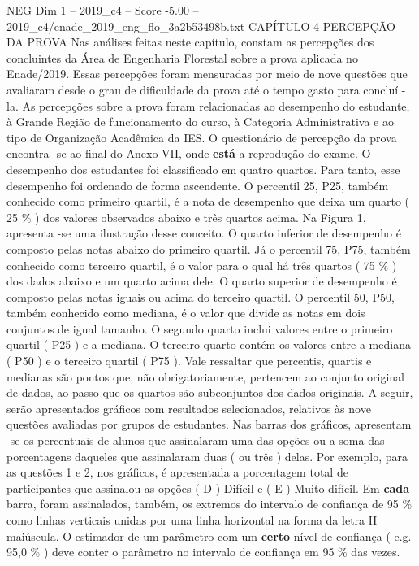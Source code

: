 \begin{textsample}{NEG Dim 1 – 2019\_c4 – Score -5.00 – 2019\_c4/enade\_2019\_eng\_flo\_3a2b53498b.txt}  \label{ex:f1_neg_086}
CAPÍTULO 4 PERCEPÇÃO DA PROVA Nas análises feitas neste capítulo, constam as percepções dos concluintes da Área de Engenharia Florestal sobre a prova aplicada no Enade/2019.
Essas percepções foram mensuradas por meio de nove questões que avaliaram desde o grau de dificuldade da prova até o tempo gasto para concluí -la.
As percepções sobre a prova foram relacionadas ao desempenho do estudante, à Grande Região de funcionamento do curso, à Categoria Administrativa e ao tipo de Organização Acadêmica da IES.
O questionário de percepção da prova encontra -se ao final do Anexo VII, onde \textbf{está} a reprodução do exame.
O desempenho dos estudantes foi classificado em quatro quartos.
Para tanto, esse desempenho foi ordenado de forma ascendente.
O percentil 25, P25, também conhecido como primeiro quartil, é a nota de desempenho que deixa um quarto ( 25 \% ) dos valores observados abaixo e três quartos acima.
Na Figura 1, apresenta -se uma ilustração desse conceito.
O quarto inferior de desempenho é composto pelas notas abaixo do primeiro quartil.
Já o percentil 75, P75, também conhecido como terceiro quartil, é o valor para o qual há três quartos ( 75 \% ) dos dados abaixo e um quarto acima dele.
O quarto superior de desempenho é composto pelas notas iguais ou acima do terceiro quartil.
O percentil 50, P50, também conhecido como mediana, é o valor que divide as notas em dois conjuntos de igual tamanho.
O segundo quarto inclui valores entre o primeiro quartil ( P25 ) e a mediana.
O terceiro quarto contém os valores entre a mediana ( P50 ) e o terceiro quartil ( P75 ).
Vale ressaltar que percentis, quartis e medianas são pontos que, não obrigatoriamente, pertencem ao conjunto original de dados, ao passo que os quartos são subconjuntos dos dados originais.
A seguir, serão apresentados gráficos com resultados selecionados, relativos às nove questões avaliadas por grupos de estudantes.
Nas barras dos gráficos, apresentam -se os percentuais de alunos que assinalaram uma das opções ou a soma das porcentagens daqueles que assinalaram duas ( ou três ) delas.
Por exemplo, para as questões 1 e 2, nos gráficos, é apresentada a porcentagem total de participantes que assinalou as opções ( D ) Difícil e ( E ) Muito difícil.
Em \textbf{cada} barra, foram assinalados, também, os extremos do intervalo de confiança de 95 \% como linhas verticais unidas por uma linha horizontal na forma da letra H maiúscula.
O estimador de um parâmetro com um \textbf{certo} nível de confiança ( e.g. 95,0 \% ) deve conter o parâmetro no intervalo de confiança em 95 \% das vezes.

\end{textsample}
